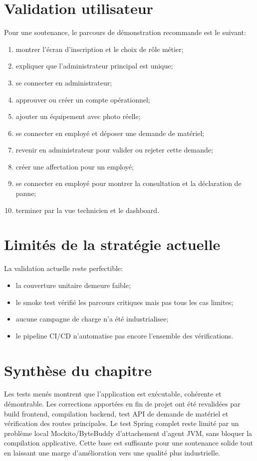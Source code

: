 \section{Validation utilisateur}
Pour une soutenance, le parcours de démonstration recommande est le suivant:
\begin{enumerate}
  \item montrer l'écran d'inscription et le choix de rôle métier;
  \item expliquer que l'administrateur principal est unique;
  \item se connecter en administrateur;
  \item approuver ou créer un compte opérationnel;
  \item ajouter un équipement avec photo réelle;
  \item se connecter en employé et déposer une demande de matériel;
  \item revenir en administrateur pour valider ou rejeter cette demande;
  \item créer une affectation pour un employé;
  \item se connecter en employé pour montrer la consultation et la déclaration de panne;
  \item terminer par la vue technicien et le dashboard.
\end{enumerate}

\section{Limités de la stratégie actuelle}
La validation actuelle reste perfectible:
\begin{itemize}
  \item la couverture unitaire demeure faible;
  \item le smoke test vérifié les parcours critiques mais pas tous les cas limites;
  \item aucune campagne de charge n'a été industrialisee;
  \item le pipeline CI/CD n'automatise pas encore l'ensemble des vérifications.
\end{itemize}

\section{Synthèse du chapitre}
Les tests menés montrent que l'application est exécutable, cohérente et démontrable. Les corrections apportées en fin de projet ont été revalidées par build frontend, compilation backend, test API de demande de matériel et vérification des routes principales. Le test Spring complet reste limité par un problème local Mockito/ByteBuddy d'attachement d'agent JVM, sans bloquer la compilation applicative. Cette base est suffisante pour une soutenance solide tout en laissant une marge d'amélioration vers une qualité plus industrielle.

